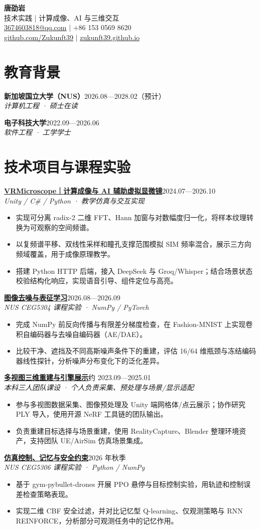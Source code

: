 \documentclass[a4paper,11pt]{article}
\newcommand{\resumeSubheading}[3]{\textbf{#1}\hfill{\small #3}\\{\small\textit{#2}}\par\vspace{3pt}}
\newcommand{\resumeItemListStart}{\begin{itemize}[leftmargin=13pt,label=\textbullet,itemsep=2.5pt,topsep=3pt,parsep=0pt]\fontsize{11pt}{15.5pt}\selectfont}
\newcommand{\resumeItemListEnd}{\end{itemize}\vspace{2pt}}
\newcommand{\resumeItem}[1]{\item #1}
\begin{document}
\begin{center}
{\Huge\bfseries 唐劭岩}\\[3pt]
{\small 技术实践 | 计算成像、AI 与三维交互}\\[3pt]
{\small \href{mailto:3674603818@qq.com}{3674603818@qq.com} $|$ +86 153 0569 8620}\\[2pt]
{\small \href{https://github.com/Zukunft39}{github.com/Zukunft39} $|$ \href{https://zukunft39.github.io}{zukunft39.github.io}}
\end{center}\vspace{-6pt}
\section{教育背景}
\resumeSubheading{新加坡国立大学（NUS）}{计算机工程 · 硕士在读}{2026.08—2028.02（预计）}
\resumeSubheading{电子科技大学}{软件工程 · 工学学士}{2022.09—2026.06}
\section{技术项目与课程实验}
\resumeSubheading{\href{https://github.com/Zukunft39/VRMicroscope}{VRMicroscope｜计算成像与 AI 辅助虚拟显微镜}}{Unity / C\# / Python · 教学仿真与交互实现}{2024.07—2026.10}
\resumeItemListStart
\resumeItem{实现可分离 radix-2 二维 FFT、Hann 加窗与对数幅度归一化，将样本纹理转换为可观察的空间频谱。}
\resumeItem{以复频谱平移、双线性采样和瞳孔支撑范围模拟 SIM 频率混合，展示三方向频域覆盖，用于成像原理教学。}
\resumeItem{搭建 Python HTTP 后端，接入 DeepSeek 与 Groq/Whisper；结合场景状态校验结构化响应，实现语音引导、组件定位与高亮。}
\resumeItemListEnd
\resumeSubheading{\href{https://zukunft39.github.io/projects/denoising.html}{图像去噪与表征学习}}{NUS CEG5304 课程实验 · NumPy / PyTorch}{2026.08—2026.09}
\resumeItemListStart
\resumeItem{完成 NumPy 前反向传播与有限差分梯度检查，在 Fashion-MNIST 上实现卷积自编码器与去噪自编码器（AE/DAE）。}
\resumeItem{比较干净、遮挡及不同高斯噪声条件下的重建，评估 16/64 维瓶颈与冻结编码器线性探针，分析噪声分布变化下的泛化差异。}
\resumeItemListEnd
\resumeSubheading{\href{https://zukunft39.github.io/projects/reconstruction.html}{多视图三维重建与引擎展示}}{本科三人团队课设 · 个人负责采集、预处理与场景/显示适配}{约 2023.09—2025.01}
\resumeItemListStart
\resumeItem{参与多视图数据采集、图像预处理及 Unity 端网格体/点云展示；协作研究 PLY 导入，使用开源 NeRF 工具链的团队输出。}
\resumeItem{负责重建目标选择与场景重建，使用 RealityCapture、Blender 整理环境资产，支持团队 UE/AirSim 仿真场景集成。}
\resumeItemListEnd
\resumeSubheading{\href{https://zukunft39.github.io/projects/control.html}{仿真控制、记忆与安全约束}}{NUS CEG5306 课程实验 · Python / NumPy}{2026 年秋季}
\resumeItemListStart
\resumeItem{基于 gym-pybullet-drones 开展 PPO 悬停与目标控制实验，用轨迹和控制误差检查策略表现。}
\resumeItem{实现二维 CBF 安全过滤，并对比记忆型 Q-learning、仅观测策略与 RNN REINFORCE，分析部分可观测任务中的记忆作用。}
\resumeItemListEnd
\end{document}
